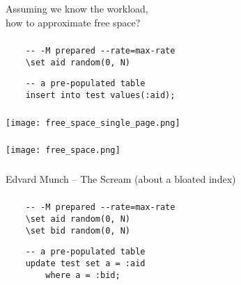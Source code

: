 \documentclass[usenames,dvipsnames, 18pt, compress, aspectratio=169]{beamer}
\begin{document}
\begin{frame}[fragile]{}
    \frametitle{}

    Assuming we know the workload,\\
    how to approximate free space?
\end{frame}

\begin{frame}[fragile]{}
    \frametitle{}

    \begin{verbatim}
    -- -M prepared --rate=max-rate
    \set aid random(0, N)
    \end{verbatim}

    \begin{verbatim}
    -- a pre-populated table
    insert into test values(:aid);
    \end{verbatim}

\end{frame}

\begin{frame}[fragile]{}
    \frametitle{}
    \begin{center}

        \texttt{[image: free\_space\_single\_page.png]}

    \end{center}
\end{frame}

\begin{frame}[fragile]{}
    \frametitle{}
    \begin{center}

        \texttt{[image: free\_space.png]}

    \end{center}
\end{frame}

\begin{frame}[fragile]{}
    \frametitle{}

    \begin{center}
     { \hspace{1.8cm} Edvard Munch -- The Scream (about a bloated index) }
	\end{center}

\end{frame}

\begin{frame}[fragile]{}
    \frametitle{}

    \begin{verbatim}
    -- -M prepared --rate=max-rate
    \set aid random(0, N)
    \set bid random(0, N)
    \end{verbatim}

    \begin{verbatim}
    -- a pre-populated table
    update test set a = :aid
        where a = :bid;
    \end{verbatim}

\end{frame}
\end{document}
